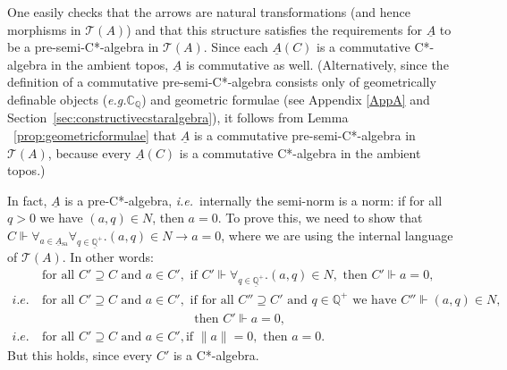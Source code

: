 \documentclass[11pt]{article}
\newcommand{\Q}{\mathbb{Q}}
\newcommand{\alg}[1]{\ensuremath{#1}}
\newcommand{\functor}[1]{\ensuremath{\underline{#1}}}
\newcommand{\cpxrat}{\ensuremath{\field{C}_\field{Q}}}
\newcommand{\asstopos}{\ensuremath{\mathcal{T}}}
\newcommand{\sa}{\ensuremath{_{\mathrm{sa}}}}
\newcommand{\field}[1]{\ensuremath{\mathbb{#1}}}
\newcommand{\uA}{\underline{A}}
\newcommand{\TA}{\mathcal{T}(A)}
\newcommand{\ie}{\textit{i.e.}}
\newcommand{\eg}{\textit{e.g.}}
\renewcommand{\TA}{\asstopos(\alg{A})}
\newenvironment{proof}[1][Proof]%
{ \begin{trivlist}%
  \item[\hskip \labelsep {\bfseries #1}]%
}%
{ \end{trivlist}%
}
\begin{document}
\begin{proof}
One easily checks that the arrows are natural transformations (and
hence morphisms in $\asstopos(\alg{A})$) and that this structure
satisfies the requirements for $\functor{\alg{A}}$ to be a
 pre-semi-C*-algebra in $\asstopos(\alg{A})$. Since each
 $\functor{\alg{A}}(C)$ is a commutative C*-algebra in the ambient
  topos, $\functor{\alg{A}}$ is commutative as well. (Alternatively, since the
definition of a commutative pre-semi-C*-algebra consists only of
  geometrically definable objects
  (\eg \cpxrat) and geometric formulae (see Appendix \ref{AppA} and
  Section~\ref{sec:constructivecstaralgebra}), it follows from
  Lemma ~\ref{prop:geometricformulae} that $\functor{\alg{A}}$ is a
  commutative pre-semi-C*-algebra in $\asstopos(\alg{A})$, because every
  $\functor{\alg{A}}(C)$ is a commutative C*-algebra in the ambient
  topos.)

  In fact, $\functor{\alg{A}}$ is a pre-C*-algebra, \ie\ internally the
  semi-norm is a norm: if for all $q>0$ we have $(a,q)\in N$, then
  $a=0$. To prove this, we need to show that $C\Vdash \forall_{a \in
  \uA\sa} \forall_{q \in \underline{\Q}^+}. (a,q)\in N \rightarrow
  a=0$, where we are using the internal language of $\TA$. In other words:
  \begin{align*}
      & \mbox{for all }C'\supseteq C\mbox{ and }a \in C', \mbox{ if
      }C'\Vdash \forall_{q \in \underline{\Q}^+}.(a,q)
     \in N,\mbox{ then }C'\Vdash a=0, \\
     \ie\ & \mbox{for all }C'\supseteq C\mbox{ and }a \in C', \mbox{ if
     for all }C''\supseteq
     C'\mbox{ and }q \in \Q^+\mbox{ we have }C''\Vdash (a,q)\in N,\\
         & \phantom{\mbox{ for all }C'\supseteq C\mbox{ and }a \in C',
         }\mbox{ then }
         C'\Vdash a=0, \\
     \ie\ & \mbox{for all }C' \supseteq C\mbox{ and }a \in C', \mbox{
     if }\|a\|=0, \mbox{ then }a=0.
  \end{align*}
  But this holds, since every $C'$ is a C*-algebra.


\end{proof}
\end{document}
